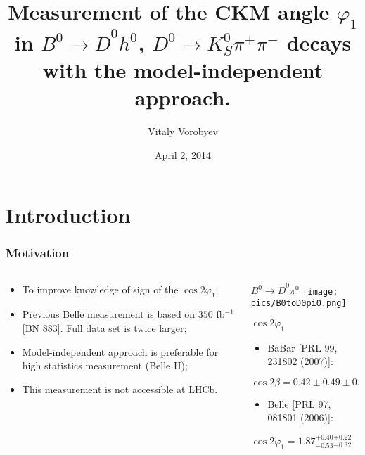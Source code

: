 \documentclass[10 pt,compress,mathserif]{beamer}
\newcommand{\dkspp}{\ensuremath{D^0\to K_S^0\pi^+\pi^-}\xspace}
\newcommand{\bdh}{\ensuremath{B^0\to \bar D^0h^0}\xspace}
\newcommand{\bdpi}{\ensuremath{B^0\to \bar D^0\pi^0}\xspace}
\begin{document}
\title{Measurement of the CKM angle $\varphi_1$ in \bdh, \dkspp decays with the model-independent approach.}
\author{Vitaly Vorobyev}
\date{April 2, 2014}
\frame{\titlepage}


\section{Introduction}
\begin{frame}
 \frametitle{Motivation}
 \begin{columns}
  \begin{column}{0.5\textwidth}
   \begin{itemize}
    \item To improve knowledge of sign of the $\cos2\varphi_1$;
    \item Previous Belle measurement is based on $350$ fb${}^{-1}$ [BN 883]. Full data set is twice larger;
    \item Model-independent approach is preferable for high statistics measurement (Belle II);
    \item This measurement is not accessible at LHCb.
   \end{itemize}

  \end{column}
  \begin{column}{0.5\textwidth}
  \begin{block}{\bdpi}
   \texttt{[image: pics/B0toD0pi0.png]}
  \end{block}
  
  \begin{block}{$\cos2\varphi_1$}
   \begin{itemize}
    \item BaBar {\small [PRL 99, 231802 (2007)]}:
   \end{itemize}
  
   $\cos2\beta = 0.42 \pm 0.49 \pm 0.09 \pm 0.13$
   
   \begin{itemize}
    \item Belle {\small [PRL 97, 081801 (2006)]}:
   \end{itemize}

   $\cos2\varphi_1 = 1.87^{+0.40}_{-0.53}{}^{+0.22}_{-0.32}$
  \end{block}

  \end{column}
 \end{columns}
\end{frame}
\end{document}
